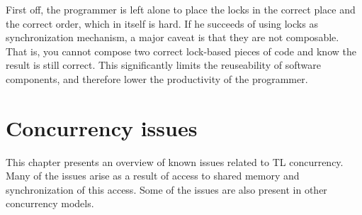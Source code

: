 \makeatletter {}\makeatother
{}
First off, the programmer is left alone to place the locks in the correct place and the correct order, which in itself is hard. If he succeeds of using locks as synchronization mechanism, a major caveat is that they are not composable\cite[p. 58]{sutter2005software}. That is, you cannot compose two correct lock-based pieces of code and know the result is still correct. This significantly limits the reuseability of software components, and therefore lower the productivity of the programmer.

\section{Concurrency issues}
This chapter presents an overview of known issues related to \ac{TL} concurrency. Many of the issues arise as a result of access to shared memory and synchronization of this access. Some of the issues are also present in other concurrency models.

